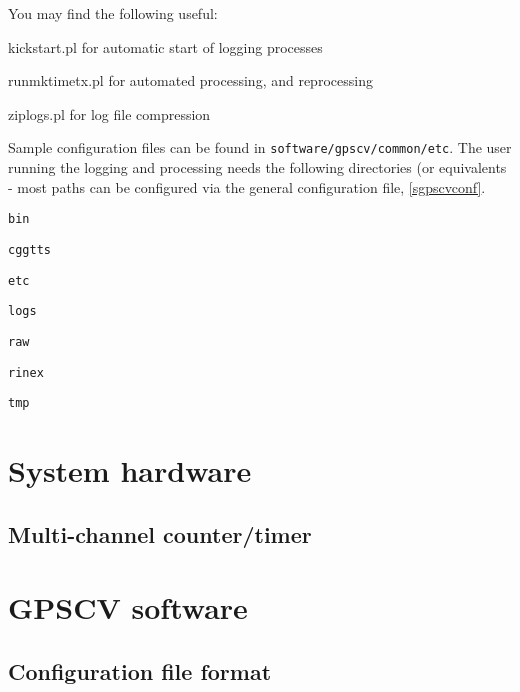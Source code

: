 \documentclass[11pt,a4paper,openany,oneside]{book}
\newcommand{\cc}[1]{{\small\texttt{#1}}}
\newenvironment{description*}%
  {\setlength{\parskip}{0pt}%
	 \begin{description}%
		\setlength{\topsep}{-12pt}%
		\setlength{\itemindent}{-12pt}%
    \setlength{\itemsep}{0pt}%
		\setlength{\itemsep}{0pt}}%
  {\end{description}}
\begin{document}
You may find the following useful:
\begin{description*}
	\item[kickstart.pl] for automatic start of logging processes
	\item[runmktimetx.pl] for automated processing, and reprocessing
	\item[ziplogs.pl] for log file compression
\end{description*}	

Sample configuration files can be found in \cc{software/gpscv/common/etc}.
The user running the logging and processing needs the following directories (or equivalents - most paths
can be configured via the general configuration file, \ref{sgpscvconf}.

\begin{description*}
	\item[\cc{bin}]
	\item[\cc{cggtts}]
	\item[\cc{etc}]
	\item[\cc{logs}]
	\item[\cc{raw}]
	\item[\cc{rinex}]
	\item[\cc{tmp}]
\end{description*}

\chapter{System hardware}

\section{Multi-channel counter/timer}



\chapter{GPSCV software}

\section{Configuration file format \label{sConfigFileFormat}}
\end{document}
